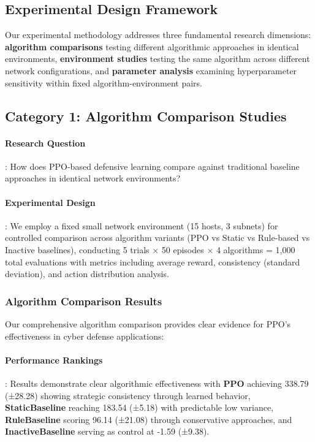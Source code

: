 \documentclass[12pt,oneside]{article}
\begin{document}
\subsection{Experimental Design Framework}

Our experimental methodology addresses three fundamental research dimensions: \textbf{algorithm comparisons} testing different algorithmic approaches in identical environments, \textbf{environment studies} testing the same algorithm across different network configurations, and \textbf{parameter analysis} examining hyperparameter sensitivity within fixed algorithm-environment pairs.

\subsection{Category 1: Algorithm Comparison Studies}

\paragraph{Research Question}: How does PPO-based defensive learning compare against traditional baseline approaches in identical network environments?

\paragraph{Experimental Design}: We employ a fixed small network environment (15 hosts, 3 subnets) for controlled comparison across algorithm variants (PPO vs Static vs Rule-based vs Inactive baselines), conducting 5 trials × 50 episodes × 4 algorithms = 1,000 total evaluations with metrics including average reward, consistency (standard deviation), and action distribution analysis.

\subsubsection{Algorithm Comparison Results}

Our comprehensive algorithm comparison provides clear evidence for PPO's effectiveness in cyber defense applications:

\paragraph{Performance Rankings}: Results demonstrate clear algorithmic effectiveness with \textbf{PPO} achieving 338.79 (±28.28) showing strategic consistency through learned behavior, \textbf{StaticBaseline} reaching 183.54 (±5.18) with predictable low variance, \textbf{RuleBaseline} scoring 96.14 (±21.08) through conservative approaches, and \textbf{InactiveBaseline} serving as control at -1.59 (±9.38).
\end{document}
